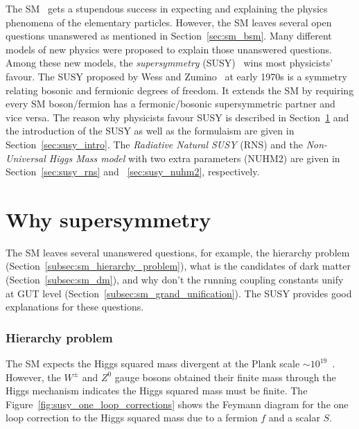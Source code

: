 The SM~\cite{BF02726525,0029-55826190469-2,PhysRevLett.19.1264,Herrero:1998eq,CBO9780511791406} gets a stupendous success in expecting and explaining the physics phenomena of the elementary particles.
However, the SM leaves several open questions unanswered as mentioned in Section~\ref{sec:sm_bsm}.
Many different models of new physics were proposed to explain those unanswered questions.
Among these new models, the \textit{supersymmetry} (SUSY)~\cite{Wess:1974tw,Lykken:1996xt,Drees:1996ca,Martin:1997ns,Bilal:2001nv,Argyres:2001eva,Peskin:2008nw,CBO9780511619250,Shadmi:2017qdk} wins most physicists' favour.
The SUSY proposed by Wess and Zumino~\cite{Wess:1974tw} at early 1970s is a symmetry relating bosonic and fermionic degrees of freedom.
It extends the SM by requiring every SM boson/fermion has a fermonic/bosonic supersymmetric partner and vice versa.
The reason why physicists favour SUSY is described in Section~\ref{sec:susy_why_susy} and the introduction of the SUSY as well as the formulaism are given in Section~\ref{sec:susy_intro}.
The \textit{Radiative Natural SUSY} (RNS) and the \textit{Non-Universal Higgs Mass model} with two extra parameters (NUHM2) are given in Section~\ref{sec:susy_rns} and ~\ref{sec:susy_nuhm2}, respectively.


\section{Why supersymmetry}
\label{sec:susy_why_susy}
The SM leaves several unanswered questions, for example, the hierarchy problem (Section~\ref{subsec:sm_hierarchy_problem}), what is the candidates of dark matter (Section~\ref{subsec:sm_dm}), and why don't the running coupling constants unify at GUT level (Section~\ref{subsec:sm_grand_unification}).
The SUSY provides good explanations for these questions.


\subsubsection{Hierarchy problem}
\label{subsubsec:susy_hierarchy_problem}
The SM expects the Higgs squared mass divergent at the Plank scale $\sim 10^{19}$~{\GeV}.
However, the $W^{\pm}$ and $Z^{0}$ gauge bosons obtained their finite mass through the Higgs mechanism indicates the Higgs squared mass must be finite.
The Figure~\ref{fig:susy_one_loop_corrections} shows the Feymann diagram for the one loop correction to the Higgs squared mass due to a fermion $f$ and a scalar $S$.

